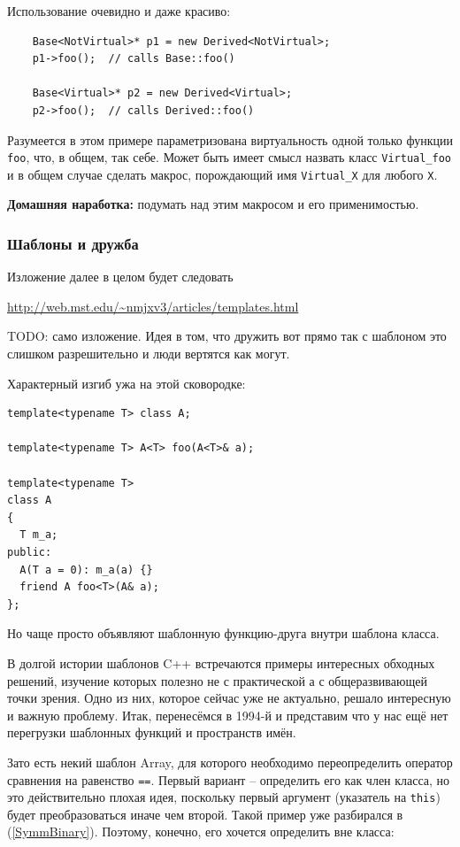 \documentclass[a4paper,12pt,oneside]{article}
\begin{document}
Использование очевидно и даже красиво:

\begin{lstlisting}
    Base<NotVirtual>* p1 = new Derived<NotVirtual>; 
    p1->foo();  // calls Base::foo() 

    Base<Virtual>* p2 = new Derived<Virtual>; 
    p2->foo();  // calls Derived::foo() 
\end{lstlisting}

Разумеется в этом примере параметризована виртуальность одной только функции \lstinline!foo!, что, в общем, так себе. Может быть имеет смысл назвать класс \lstinline!Virtual_foo! и в общем случае сделать макрос, порождающий имя \lstinline!Virtual_X! для любого \lstinline!X!.

\textbf{Домашняя наработка:} подумать над этим макросом и его применимостью.

\subsubsection{Шаблоны и дружба}\label{BartonNackman}

Изложение далее в целом будет следовать 

\url{http://web.mst.edu/~nmjxv3/articles/templates.html}

TODO: само изложение. Идея в том, что дружить вот прямо так с шаблоном это слишком разрешительно и люди вертятся как могут.

Характерный изгиб ужа на этой сковородке:

\begin{lstlisting}
template<typename T> class A;

template<typename T> A<T> foo(A<T>& a);

template<typename T>
class A
{
  T m_a;
public:
  A(T a = 0): m_a(a) {}
  friend A foo<T>(A& a);
};
\end{lstlisting}

Но чаще просто объявляют шаблонную функцию-друга внутри шаблона класса.

В долгой истории шаблонов C++ встречаются примеры интересных обходных решений, изучение которых полезно не с практической а с общеразвивающей точки зрения. Одно из них, которое сейчас уже не актуально, решало интересную и важную проблему. Итак, перенесёмся в 1994-й и представим что у нас ещё нет перегрузки шаблонных функций и пространств имён.

Зато есть некий шаблон Array, для которого необходимо переопределить оператор сравнения на равенство \lstinline!==!. Первый вариант -- определить его как член класса, но это действительно плохая идея, поскольку первый аргумент (указатель на \lstinline!this!) будет преобразоваться иначе чем второй. Такой пример уже разбирался в (\ref{SymmBinary}). Поэтому, конечно, его хочется определить вне класса:
\end{document}
